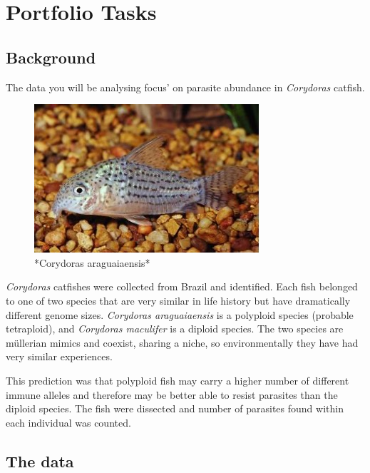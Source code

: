 \documentclass[
]{book}
\begin{document}
\hypertarget{portfolio-tasks}{%
\chapter{Portfolio Tasks}\label{portfolio-tasks}}

\hypertarget{background}{%
\section{Background}\label{background}}

The data you will be analysing focus' on parasite abundance in \emph{Corydoras} catfish.

\begin{figure}
\includegraphics[width=0.9\linewidth]{figures/cory} \caption{*Corydoras araguaiaensis*}\label{fig:unnamed-chunk-79}
\end{figure}

\emph{Corydoras} catfishes were collected from Brazil and identified. Each fish belonged to one of two species that are very similar in life history but have dramatically different genome sizes. \emph{Corydoras araguaiaensis} is a polyploid species (probable tetraploid), and \emph{Corydoras maculifer} is a diploid species. The two species are müllerian mimics and coexist, sharing a niche, so environmentally they have had very similar experiences.

This prediction was that polyploid fish may carry a higher number of different immune alleles and therefore may be better able to resist parasites than the diploid species. The fish were dissected and number of parasites found within each individual was counted.

\hypertarget{the-data-1}{%
\section{The data}\label{the-data-1}}
\end{document}
